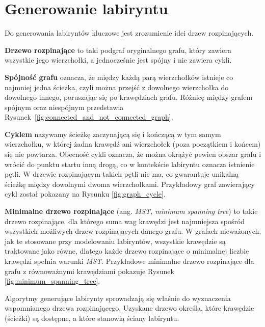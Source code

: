 \section{Generowanie labiryntu}

Do generowania labiryntów kluczowe jest zrozumienie idei drzew rozpinających.

\textbf{Drzewo rozpinające} \cite{cormen2009} to taki podgraf oryginalnego grafu, który zawiera wszystkie jego wierzchołki, a jednocześnie jest spójny i nie zawiera cykli. 

\textbf{Spójność grafu} \cite{balakrishnan2005} oznacza, że między każdą parą wierzchołków istnieje co najmniej jedna ścieżka, czyli można przejść z dowolnego wierzchołka do dowolnego innego, poruszając się po krawędziach grafu. Różnicę między grafem spójnym oraz niespójnym przedstawia Rysunek~\ref{fig:connected_and_not_connected_graph}.



\textbf{Cyklem} \cite{balakrishnan2005} nazywamy ścieżkę zaczynającą się i kończącą w tym samym wierzchołku, w której żadna krawędź ani wierzchołek (poza początkiem i końcem) się nie powtarza. Obecność cykli oznacza, że można okrążyć pewien obszar grafu i wrócić do punktu startu inną drogą, co w kontekście labiryntu oznacza istnienie pętli. W drzewie rozpinającym takich pętli nie ma, co gwarantuje unikalną ścieżkę między dowolnymi dwoma wierzchołkami. Przykładowy graf zawierający cykl został pokazany na Rysunku \ref{fig:graph_cycle}.



\textbf{Minimalne drzewo rozpinające} \cite{cormen2009} (ang. \textit{MST, minimum spanning tree}) to takie drzewo rozpinające, dla którego suma wag krawędzi jest najmniejsza spośród wszystkich możliwych drzew rozpinających danego grafu. W grafach nieważonych, jak te stosowane przy modelowaniu labiryntów, wszystkie krawędzie są traktowane jako równe, dlatego każde drzewo rozpinające o minimalnej liczbie krawędzi spełnia warunki \textit{MST}. Przykładowe minimalne drzewo rozpinające dla grafu z równoważnymi krawędziami pokazuje Rysunek \ref{fig:minimum_spanning_tree}.



Algorytmy generujące labirynty sprowadzają się właśnie do wyznaczenia wspomnianego drzewa rozpinającego. 
Uzyskane drzewo określa, które krawędzie (ścieżki) są dostępne, a które stanowią ściany labiryntu.






